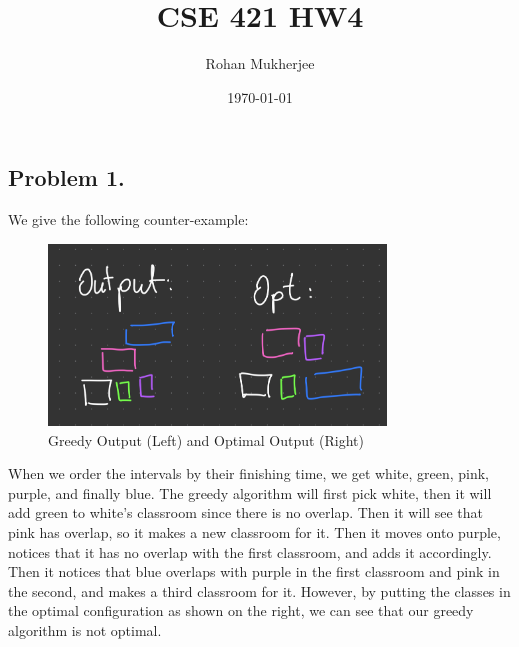 \documentclass[12pt]{article}
\title{CSE 421 HW4}
\date{\today}
\author{Rohan Mukherjee}
\theoremstyle{definitionstyle}
\begin{document}
    \maketitle

    \subsection*{Problem 1.}
    We give the following counter-example:
    \begin{figure}[H]
        \centering
        \includegraphics[width=0.8\textwidth]{counter.jpg}
        \caption{Greedy Output (Left) and Optimal Output (Right)}
    \end{figure}
    When we order the intervals by their finishing time, we get white, green, pink, purple, and finally blue. The greedy algorithm will first pick white, then it will add green to white's classroom since there is no overlap. Then it will see that pink has overlap, so it makes a new classroom for it. Then it moves onto purple, notices that it has no overlap with the first classroom, and adds it accordingly. Then it notices that blue overlaps with purple in the first classroom and pink in the second, and makes a third classroom for it. However, by putting the classes in the optimal configuration as shown on the right, we can see that our greedy algorithm is not optimal.
\end{document}
